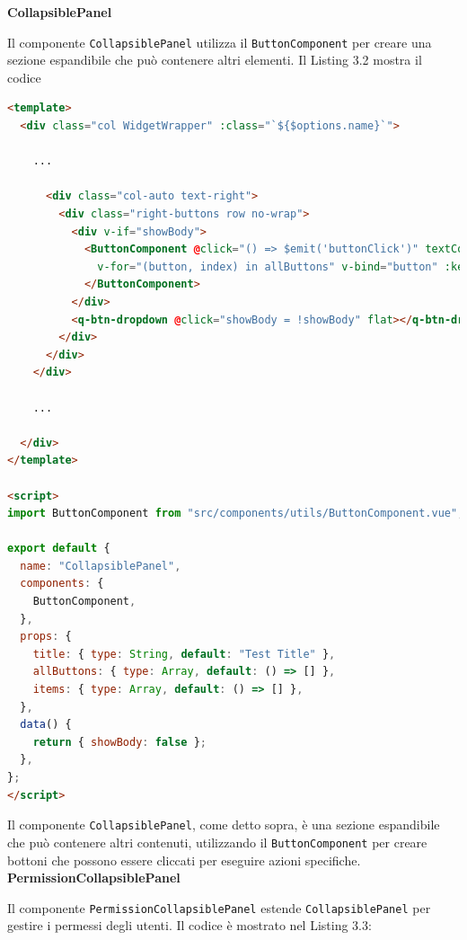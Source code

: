 \documentclass[a4paper, 12pt]{book}
\begin{document}
\textbf{CollapsiblePanel}

Il componente \texttt{CollapsiblePanel} utilizza il \texttt{ButtonComponent} per creare una sezione espandibile che
può contenere altri elementi. Il Listing 3.2 mostra il codice\\

\begin{lstlisting}[language=HTML, caption=Implementazione di CollapsiblePanel]
<template>
  <div class="col WidgetWrapper" :class="`${$options.name}`">

    ...

      <div class="col-auto text-right">
        <div class="right-buttons row no-wrap">
          <div v-if="showBody">
            <ButtonComponent @click="() => $emit('buttonClick')" textColor="primary" btnClass="grey"
              v-for="(button, index) in allButtons" v-bind="button" :key="`${index}buttons`">
            </ButtonComponent>
          </div>
          <q-btn-dropdown @click="showBody = !showBody" flat></q-btn-dropdown>
        </div>
      </div>
    </div>

    ...

  </div>
</template>

<script>
import ButtonComponent from "src/components/utils/ButtonComponent.vue";

export default {
  name: "CollapsiblePanel",
  components: {
    ButtonComponent,
  },
  props: {
    title: { type: String, default: "Test Title" },
    allButtons: { type: Array, default: () => [] },
    items: { type: Array, default: () => [] },
  },
  data() {
    return { showBody: false };
  },
};
</script>
\end{lstlisting}

Il componente \texttt{CollapsiblePanel}, come detto sopra, è una sezione espandibile che può contenere altri contenuti, utilizzando
il \texttt{ButtonComponent} per creare bottoni che possono essere cliccati per eseguire azioni specifiche.\\

\textbf{PermissionCollapsiblePanel}

Il componente \texttt{PermissionCollapsiblePanel} estende \texttt{CollapsiblePanel} per gestire i permessi
degli utenti. Il codice è mostrato nel Listing 3.3:\\
\end{document}
